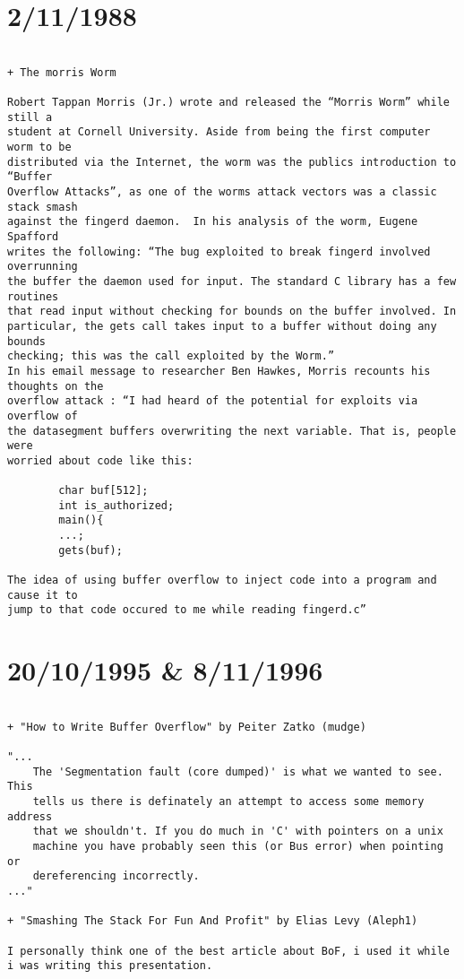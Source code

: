 \section{2/11/1988 }
\begin{frame}[fragile]
\begin{verbatim}

+ The morris Worm

Robert Tappan Morris (Jr.) wrote and released the “Morris Worm” while still a
student at Cornell University. Aside from being the first computer worm to be
distributed via the Internet, the worm was the publics introduction to “Buffer
Overflow Attacks”, as one of the worms attack vectors was a classic stack smash
against the fingerd daemon.  In his analysis of the worm, Eugene Spafford 
writes the following: “The bug exploited to break fingerd involved overrunning
the buffer the daemon used for input. The standard C library has a few routines
that read input without checking for bounds on the buffer involved. In
particular, the gets call takes input to a buffer without doing any bounds
checking; this was the call exploited by the Worm.”
In his email message to researcher Ben Hawkes, Morris recounts his thoughts on the
overflow attack : “I had heard of the potential for exploits via overflow of
the datasegment buffers overwriting the next variable. That is, people were
worried about code like this:

        char buf[512];
        int is_authorized;
        main(){
        ...;
        gets(buf);

The idea of using buffer overflow to inject code into a program and cause it to
jump to that code occured to me while reading fingerd.c”

\end{verbatim}
\end{frame}
\section{20/10/1995 & 8/11/1996}
\begin{frame}[fragile]
\begin{verbatim}

+ "How to Write Buffer Overflow" by Peiter Zatko (mudge)

"...
    The 'Segmentation fault (core dumped)' is what we wanted to see. This
    tells us there is definately an attempt to access some memory address
    that we shouldn't. If you do much in 'C' with pointers on a unix
    machine you have probably seen this (or Bus error) when pointing or
    dereferencing incorrectly.
..."

+ "Smashing The Stack For Fun And Profit" by Elias Levy (Aleph1)

I personally think one of the best article about BoF, i used it while
i was writing this presentation.

\end{verbatim}
\end{frame}

